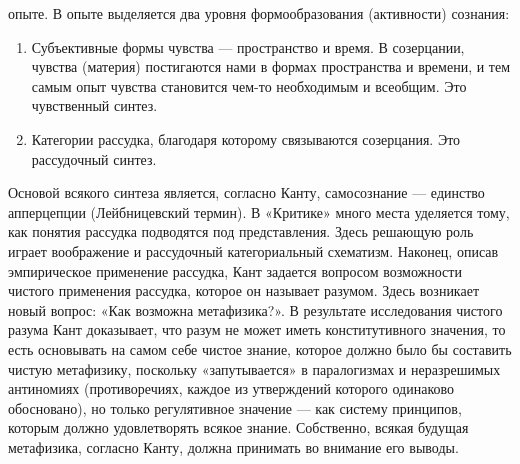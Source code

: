 \documentclass[12pt]{article}
\begin{document}
опыте. В опыте выделяется два уровня формообразования (активности) сознания:
\begin{enumerate}
\item Субъективные формы
	чувства — пространство и время. В созерцании, чувства (материя) постигаются нами в формах пространства и
	времени, и тем самым опыт чувства становится чем-то необходимым и всеобщим. Это чувственный синтез.
\item Категории рассудка, благодаря которому связываются созерцания. Это рассудочный синтез.
\end{enumerate}
Основой всякого
синтеза является, согласно Канту, самосознание — единство апперцепции (Лейбницевский термин). В
«Критике» много места уделяется тому, как понятия рассудка подводятся под представления. Здесь решающую
роль играет воображение и рассудочный категориальный схематизм. Наконец, описав эмпирическое применение
рассудка, Кант задается вопросом возможности чистого применения рассудка, которое он называет разумом.
Здесь возникает новый вопрос: «Как возможна метафизика?». В результате исследования чистого разума Кант
доказывает, что разум не может иметь конститутивного значения, то есть основывать на самом себе чистое
знание, которое должно было бы составить чистую метафизику, поскольку «запутывается» в паралогизмах и
неразрешимых антиномиях (противоречиях, каждое из утверждений которого одинаково обосновано), но только
регулятивное значение — как систему принципов, которым должно удовлетворять всякое знание. Собственно,
всякая будущая метафизика, согласно Канту, должна принимать во внимание его выводы.
\end{document}
